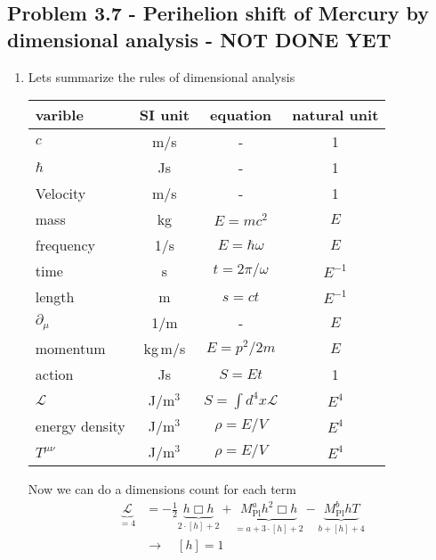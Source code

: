 \documentclass[../main.tex]{subfiles}
\begin{document}
\subsection{Problem 3.7 - Perihelion shift of Mercury by dimensional analysis - NOT DONE YET}
\begin{enumerate}[label=(\alph*)]
\item Lets summarize the rules of dimensional analysis 

\begin{center}
\begin{tabular}{ lccc } 
 \hline
 varible & SI unit &equation & natural unit \\ 
 \hline\hline
 $c$               & m/s    & -                        & 1        \\
 $\hbar$           & Js     & -                        & 1        \\
 Velocity          & m/s    & -                        & 1      \\
 mass              & kg     & $E=mc^2$                 & $E$      \\
 frequency         & 1/s    & $E=\hbar\omega$          & $E$      \\
 time              & s      & $t=2\pi/\omega$          & $E^{-1}$ \\
 length            & m      & $s=ct$                   & $E^{-1}$ \\
 $\partial_\mu$    & 1/m    & -                        & $E$      \\
 momentum          & kg\,m/s& $E=p^2/2m$               & $E$      \\
 action            & Js     & $S=Et$                   & 1        \\
 $\mathcal{L}$     & J/m$^3$& $S=\int d^4x\mathcal{L}$ & $E^4$    \\
 energy density    & J/m$^3$& $\rho=E/V$               & $E^4$    \\
 $T^{\mu\nu}$      & J/m$^3$& $\rho=E/V$               & $E^4$    \\
 \hline
\end{tabular}
\end{center}
Now we can do a dimensions count for each term
\begin{align}
\underbrace{\mathcal{L}}_{=4}&=-\frac{1}{2}\underbrace{h\Box h}_{2\cdot[h]+2}+ \underbrace{M_\text{Pl}^a h^2\Box h}_{=a+3\cdot[h]+2}-\underbrace{M_\text{Pl}^bhT}_{b+[h]+4}\\
&\rightarrow\quad[h]=1\\

\end{align}
\end{enumerate}
\end{document}
